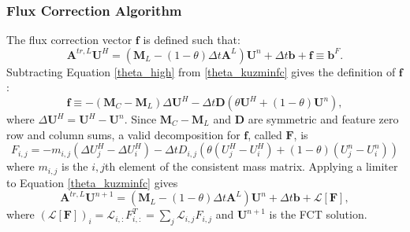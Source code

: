 \subsubsection{Flux Correction Algorithm}\label{theta_kuzmin}
The flux correction vector $\mathbf{f}$ is defined such that:
\begin{equation}\label{theta_kuzminfc}
   \mathbf{A}^{tr,L}\mathbf{U}^H
      = (\mathbf{M}_L-(1-\theta)\Delta t\mathbf{A}^L)\mathbf{U}^n
      + \Delta t\mathbf{b} + \mathbf{f} \equiv \mathbf{b}^F.
\end{equation}
Subtracting Equation \ref{theta_high} from \ref{theta_kuzminfc} gives the definition of
$\mathbf{f}$:
\begin{equation}\label{theta_kuzminFdef}
   \mathbf{f} \equiv -(\mathbf{M}_C-\mathbf{M}_L)\Delta\mathbf{U}^H
      -\Delta t\mathbf{D}\left(\theta\mathbf{U}^H
      +(1-\theta)\mathbf{U}^n\right),
\end{equation}
where $\Delta\mathbf{U}^H = \mathbf{U}^H - \mathbf{U}^n$. Since
$\mathbf{M}_C-\mathbf{M}_L$ and $\mathbf{D}$ are symmetric
and feature zero row and column sums, a valid decomposition for $\mathbf{f}$,
called $\mathbf{F}$, is
\begin{equation}
   F_{i,j} = -m_{i,j}(\Delta U^H_j - \Delta U^H_i)
    - \Delta t D_{i,j}\left(\theta(U^H_j - U^H_i) + (1-\theta)(U^n_j - U^n_i)\right)
\end{equation}
where $m_{i,j}$ is the $i,j$th element of the consistent mass matrix.
Applying a limiter to Equation \ref{theta_kuzminfc} gives
\begin{equation}\label{theta_limited}
   \mathbf{A}^{tr,L}\mathbf{U}^{n+1}
      = (\mathbf{M}_L-(1-\theta)\Delta t\mathbf{A}^L)\mathbf{U}^n + \Delta t\mathbf{b} + \mathcal{L}[\mathbf{F}],
\end{equation}
where $(\mathcal{L}[\mathbf{F}])_i = \mathcal{L}_{i,:}F_{i,:}^T
= \sum\limits_j \mathcal{L}_{i,j}F_{i,j}$ and $\mathbf{U}^{n+1}$ is the FCT solution.

